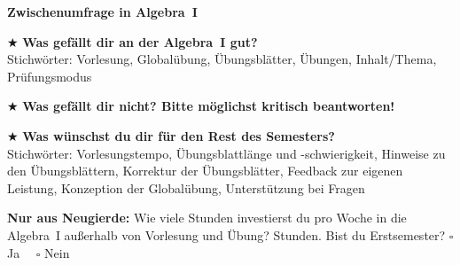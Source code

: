 \documentclass[12pt,a4paper,ngerman]{scrartcl}
\newcommand{\quest}[1]{$\bigstar$ #1 \vfill}
\newcommand{\neugierde}[1]{\textbf{Nur aus Neugierde:} #1}
\begin{document}
\begin{center}\Large\textbf{Zwischenumfrage in Algebra~I}\end{center}

\quest{\textbf{Was gefällt dir an der Algebra~I gut?} \\
Stichwörter: Vorlesung, Globalübung, Übungsblätter, Übungen, Inhalt/Thema,
Prüfungsmodus}

\hrulefill

\quest{\textbf{Was gefällt dir nicht? Bitte möglichst kritisch beantworten!}}

\hrulefill

\quest{\textbf{Was wünschst du dir für den Rest des Semesters?} \\
Stichwörter: Vorlesungstempo, Übungsblattlänge und -schwierigkeit,
Hinweise zu den Übungsblättern, Korrektur der Übungsblätter, Feedback zur
eigenen Leistung, Konzeption der Globalübung, Unterstützung bei Fragen}

\hrulefill

\neugierde{{Wie viele Stunden investierst du pro Woche in die
Algebra~I außerhalb von Vorlesung und Übung?}}
\underline{\quad\qquad} Stunden.
Bist du Erstsemester? $\square$ Ja $\quad\square$ Nein
\end{document}
